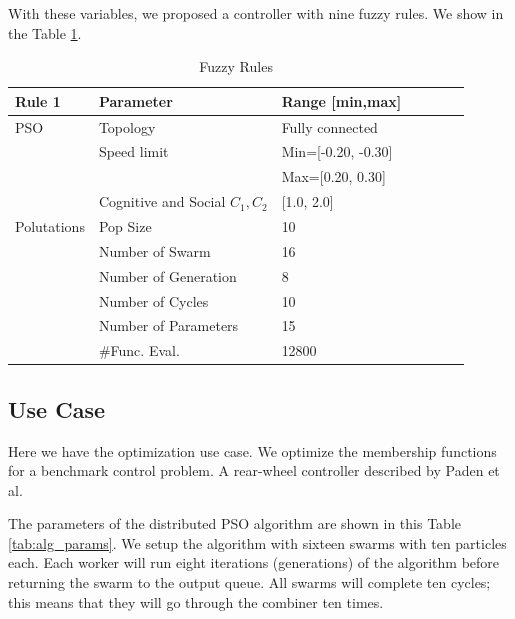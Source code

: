 \documentclass[runningheads]{llncs}
\begin{document}
With these variables, we proposed a controller with nine fuzzy rules. We show in the Table \ref{tab:fuzzy_rules}. 

\begin{table}[ht] 
\caption{Fuzzy Rules}\label{tab:fuzzy_rules}
\setlength{\tabcolsep}{10pt}
\begin{tabular}{l l l l l l l}
\hline
\textbf{Rule 1} & \textbf{Parameter}	& \textbf{Range [min,max]}\\ \hline
PSO & Topology & Fully connected  \\
& Speed limit  & Min=[-0.20, -0.30] \\
&              & Max=[0.20, 0.30]  \\
& Cognitive and Social $C_1,C_2$ &  [1.0, 2.0]  \\ \hline
Polutations & Pop Size                & 10  \\
            & Number of Swarm         & 16 \\
            & Number of Generation    &  8 \\
            & Number of Cycles        & 10   \\
            & Number of Parameters    & 15   \\   
            & \#Func. Eval.           & 12800 \\ \hline
\end{tabular}
\end{table}
\subsection{Use Case}\label{sub:use_case}

Here we have the optimization use case. We optimize the membership functions for a benchmark control problem. A rear-wheel controller described by Paden et al.

The parameters of the distributed PSO algorithm are shown in this Table  \ref{tab:alg_params}.
We setup the algorithm with sixteen swarms with ten particles each. Each worker will run eight iterations (generations) of the algorithm before returning the swarm to the output queue. All swarms will complete ten cycles; this means that they will go through the combiner ten times.
\end{document}
